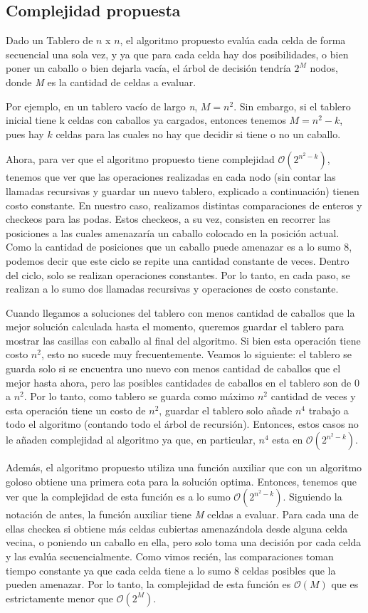 \subsection{Complejidad propuesta}
Dado un Tablero de $n$ x $n$, el algoritmo propuesto evalúa cada celda de forma secuencial una sola vez, y ya que para cada celda hay dos posibilidades, o bien poner un caballo o bien dejarla vacía, el árbol de decisión tendría $2^{M}$ nodos, donde \textit{M} es la cantidad de celdas a evaluar.

Por ejemplo, en un tablero vacío de largo \textit{n}, $M= n^2$. Sin embargo, si el tablero inicial tiene k celdas con caballos ya cargados, entonces tenemos $M=n^2 - k$, pues hay $k$ celdas para las cuales no hay que decidir si tiene o no un caballo.

Ahora, para ver que el algoritmo propuesto tiene complejidad $\mathcal{O}(2^{n^2 - k})$, tenemos que ver que las operaciones realizadas en cada nodo (sin contar las llamadas recursivas y guardar un nuevo tablero, explicado a continuación) tienen costo constante. En nuestro caso, realizamos distintas comparaciones de enteros y checkeos para las podas. Estos checkeos, a su vez, consisten en recorrer las posiciones a las cuales amenazaría un caballo colocado en la posición actual. Como la cantidad de posiciones que un caballo puede amenazar es a lo sumo 8, podemos decir que este ciclo se repite una cantidad constante de veces. Dentro del ciclo, solo se realizan operaciones constantes. Por lo tanto, en cada paso, se realizan a lo sumo dos llamadas recursivas y operaciones de costo constante.

Cuando llegamos a soluciones del tablero con menos cantidad de caballos que la mejor solución calculada hasta el momento, queremos guardar el tablero para mostrar las casillas con caballo al final del algoritmo. Si bien esta operación tiene costo $n^2$, esto no sucede muy frecuentemente. Veamos lo siguiente: el tablero se guarda solo si se encuentra uno nuevo con menos cantidad de caballos que el mejor hasta ahora, pero las posibles cantidades de caballos en el tablero son de 0 a $n^2$. Por lo tanto, como tablero se guarda como máximo $n^2$ cantidad de veces y esta operación tiene un costo de $n^2$, guardar el tablero solo añade $n^4$ trabajo a todo el algoritmo (contando todo el árbol de recursión). Entonces, estos casos no le añaden complejidad al algoritmo ya que, en particular, $n^4$ esta en $\mathcal{O}(2^{n^2 - k})$.

Además, el algoritmo propuesto utiliza una función auxiliar que con un algoritmo goloso obtiene una primera cota para la solución optima. Entonces, tenemos que ver que la complejidad de esta función es a lo sumo $\mathcal{O}(2^{n^2 - k})$. Siguiendo la notación de antes, la función auxiliar tiene \textit{M} celdas a evaluar. Para cada una de ellas checkea si obtiene más celdas cubiertas amenazándola desde alguna celda vecina, o poniendo un caballo en ella, pero solo toma una decisión por cada celda y las evalúa secuencialmente. Como vimos recién, las comparaciones toman tiempo constante ya que cada celda tiene a lo sumo 8 celdas posibles que la pueden amenazar. Por lo tanto, la complejidad de esta función es $\mathcal{O}(M)$ que es estrictamente menor que $\mathcal{O}(2^{M})$.

